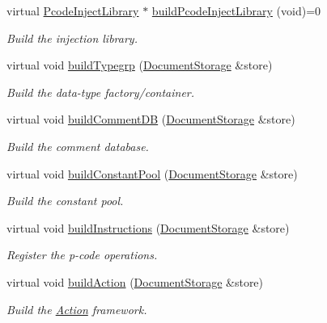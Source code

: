 \begin{DoxyCompactItemize}
virtual \mbox{\hyperlink{class_pcode_inject_library}{Pcode\+Inject\+Library}} $\ast$ \mbox{\hyperlink{class_architecture_a7dae4f59e2c196a623b45e68cacc1a7a}{build\+Pcode\+Inject\+Library}} (void)=0
\begin{DoxyCompactList}\small\item\em Build the injection library. \end{DoxyCompactList}\item 
virtual void \mbox{\hyperlink{class_architecture_aaf041374ee649d2c0d8e95e450af5bf9}{build\+Typegrp}} (\mbox{\hyperlink{class_document_storage}{Document\+Storage}} \&store)
\begin{DoxyCompactList}\small\item\em Build the data-\/type factory/container. \end{DoxyCompactList}\item 
virtual void \mbox{\hyperlink{class_architecture_a517bf0e0ba766b241edf122422766249}{build\+Comment\+DB}} (\mbox{\hyperlink{class_document_storage}{Document\+Storage}} \&store)
\begin{DoxyCompactList}\small\item\em Build the comment database. \end{DoxyCompactList}\item 
virtual void \mbox{\hyperlink{class_architecture_aed8aa1186293e453601bedb0db3d4ec1}{build\+Constant\+Pool}} (\mbox{\hyperlink{class_document_storage}{Document\+Storage}} \&store)
\begin{DoxyCompactList}\small\item\em Build the constant pool. \end{DoxyCompactList}\item 
virtual void \mbox{\hyperlink{class_architecture_aa059c551a53018c8d70a1c2f9fc6ed73}{build\+Instructions}} (\mbox{\hyperlink{class_document_storage}{Document\+Storage}} \&store)
\begin{DoxyCompactList}\small\item\em Register the p-\/code operations. \end{DoxyCompactList}\item 
virtual void \mbox{\hyperlink{class_architecture_ad646d95818d9c3615da8a259732546b8}{build\+Action}} (\mbox{\hyperlink{class_document_storage}{Document\+Storage}} \&store)
\begin{DoxyCompactList}\small\item\em Build the \mbox{\hyperlink{class_action}{Action}} framework. \end{DoxyCompactList}\item 

\end{DoxyCompactItemize}
